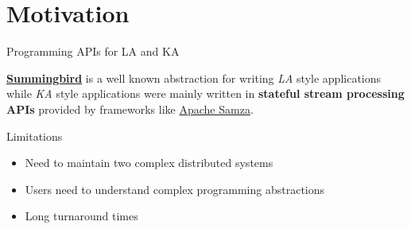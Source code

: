 \documentclass[newPxFont]{beamer}
\renewcommand{\event}[3][e]{%
  \pgfmathsetlength\xstop{(#2-\theyearstart)*\unit}%
  \ifx #1e%
    \draw[fill=black,draw=none,opacity=0.5]%
      (\xstop, 0) circle (.2\unit)%
      node[opacity=1,rotate=45,right=.2\unit] {#3};%
  \else%
    \pgfmathsetlength\xstart{(#1-\theyearstart)*\unit}%
    \draw[fill=black,draw=none,opacity=0.5,rounded corners=.1\unit]%
      (\xstart,-.1\unit) rectangle%
      node[opacity=1,rotate=45,right=.2\unit] {#3} (\xstop,.1\unit);%
  \fi}%
\begin{document}





%
%

\section{Motivation}


\begin{frame}{Programming APIs for LA and KA}

\href{https://github.com/twitter/summingbird}{\textbf{Summingbird}} is a well known abstraction for writing \textit{LA} style applications while \textit{KA} style applications were mainly written in \textbf{stateful stream processing APIs} provided by frameworks like \href{http://samza.apache.org}{Apache Samza}.

\begin{block}{Limitations}
\begin{itemize}
	\item Need to maintain two complex distributed systems
	\item Users need to understand complex programming abstractions 
	\item Long turnaround times
\end{itemize}
\end{block}

\end{frame}
\end{document}
